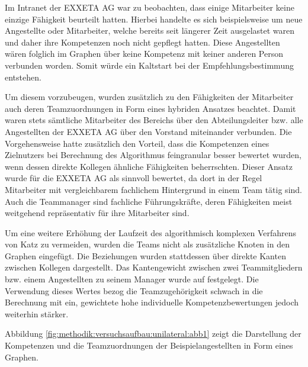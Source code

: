 Im Intranet der EXXETA AG war zu beobachten, dass einige Mitarbeiter keine einzige Fähigkeit beurteilt hatten. Hierbei handelte es sich beispielsweise um neue Angestellte oder Mitarbeiter, welche bereits seit längerer Zeit ausgelastet waren und daher ihre Kompetenzen noch nicht gepflegt hatten. Diese Angestellten wären folglich im Graphen über keine Kompetenz mit keiner anderen Person verbunden worden. Somit würde ein Kaltstart bei der Empfehlungsbestimmung entstehen.

Um diesem vorzubeugen, wurden zusätzlich zu den Fähigkeiten der Mitarbeiter auch deren Teamzuordnungen in Form eines hybriden Ansatzes beachtet. Damit waren stets sämtliche Mitarbeiter des Bereichs \JES über den Abteilungsleiter bzw. alle Angestellten der EXXETA AG über den Vorstand miteinander verbunden. Die Vorgehensweise hatte zusätzlich den Vorteil, dass die Kompetenzen eines Zielnutzers bei Berechnung des Algorithmus feingranular besser bewertet wurden, wenn dessen direkte Kollegen ähnliche Fähigkeiten beherrschten. Dieser Ansatz wurde für die EXXETA AG als sinnvoll bewertet, da dort in der Regel Mitarbeiter mit vergleichbarem fachlichem Hintergrund in einem Team tätig sind. Auch die Teammanager sind fachliche Führungskräfte, deren Fähigkeiten meist weitgehend repräsentativ für ihre Mitarbeiter sind.

Um eine weitere Erhöhung der Laufzeit des algorithmisch komplexen Verfahrens von Katz zu vermeiden, wurden die Teams nicht als zusätzliche Knoten in den Graphen eingefügt. Die Beziehungen wurden stattdessen über direkte Kanten zwischen Kollegen dargestellt. Das Kantengewicht zwischen zwei Teammitgliedern bzw. einem Angestellten zu seinem Manager wurde auf \teamgewichtString festgelegt. Die Verwendung dieses Wertes bezog die Teamzugehörigkeit schwach in die Berechnung mit ein, gewichtete hohe individuelle Kompetenzbewertungen jedoch weiterhin stärker.

Abbildung \ref{fig:methodik:versuchsaufbau:unilateral:abb1} zeigt die Darstellung der Kompetenzen und die Teamzuordnungen der Beispielangestellten in Form eines Graphen.

